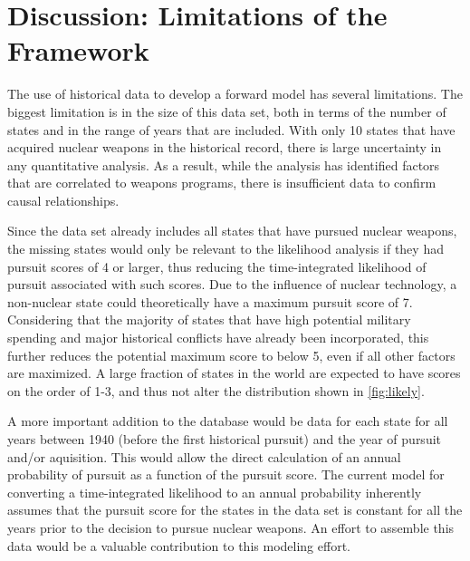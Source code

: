 \section{Discussion: Limitations of the Framework}
\label{s_discuss}
The use of historical data to develop a forward model has several limitations. The biggest limitation is in the size of this data set, both in terms of the number of states and in the range of years that are included.  With only 10 states that have acquired nuclear weapons in the historical record, there is large uncertainty in any quantitative analysis. As a result, while the analysis has identified factors that are correlated to weapons programs, there is insufficient data to confirm causal relationships.

Since the data set already includes all states that have pursued nuclear weapons, the missing states would only be relevant to the likelihood analysis if they had pursuit scores of 4 or larger, thus reducing the time-integrated likelihood of pursuit associated with such scores. Due to the influence of nuclear technology, a non-nuclear state could theoretically have a maximum pursuit score of 7. Considering that the majority of states that have high potential military spending and major historical conflicts have already been incorporated, this further reduces the potential maximum score to below 5, even if all other factors are maximized.  A large fraction of states in the world are expected to have scores on the order of 1-3, and thus not alter the distribution shown in \ref{fig:likely}.

A more important addition to the database would be data for each state for all years between 1940 (before the first historical pursuit) and the year of pursuit and/or aquisition.  This would allow the direct calculation of an annual probability of pursuit as a function of the pursuit score.  The current model for converting a time-integrated likelihood to an annual probability inherently assumes that the pursuit score for the states in the data set is constant for all the years prior to the decision to pursue nuclear weapons.  An effort to assemble this data would be a valuable contribution to this modeling effort.



